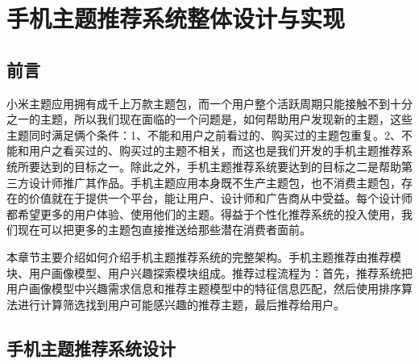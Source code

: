 
\chapter{手机主题推荐系统整体设计与实现}
    \section{前言}
    小米主题应用拥有成千上万款主题包，而一个用户整个活跃周期只能接触不到十分之一的主题，所以我们现在面临的一个问题是，如何帮助用户发现新的主题，这些主题同时满足俩个条件：1、不能和用户之前看过的、购买过的主题包重复。2、不能和用户之看买过的、购买过的主题不相关，而这也是我们开发的手机主题推荐系统所要达到的目标之一。除此之外，手机主题推荐系统要达到的目标之二是帮助第三方设计师推广其作品。手机主题应用本身既不生产主题包，也不消费主题包，存在的价值就在于提供一个平台，能让用户、设计师和广告商从中受益。每个设计师都希望更多的用户体验、使用他们的主题。得益于个性化推荐系统的投入使用，我们现在可以把更多的主题包直接推送给那些潜在消费者面前。

    本章节主要介绍如何介绍手机主题推荐系统的完整架构。手机主题推荐由推荐模块、用户画像模型、用户兴趣探索模块组成。推荐过程流程为：首先，推荐系统把用户画像模型中兴趣需求信息和推荐主题模型中的特征信息匹配，然后使用排序算法进行计算筛选找到用户可能感兴趣的推荐主题，最后推荐给用户。
    \section{手机主题推荐系统设计}
    
    \begin{figure}
      \centering
        \label{pic:construct}
    \end{figure}

